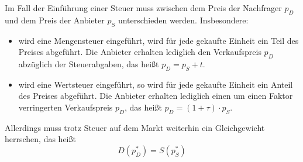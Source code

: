 Im Fall der Einführung einer Steuer muss zwischen dem Preis der Nachfrager $p_D$ und dem Preis der Anbieter $p_S$ unterschieden werden. Insbesondere:
\begin{itemize}
	\item wird eine Mengensteuer eingeführt, wird für jede gekaufte Einheit ein Teil des Preises abgeführt. Die Anbieter erhalten lediglich den Verkaufspreis $p_D$ abzüglich der Steuerabgaben, das heißt $p_D = p_S + t$.
	\item wird eine Wertsteuer eingeführt, so wird für jede gekaufte Einheit ein  Anteil des Preises abgeführt. Die Anbieter erhalten lediglich einen um einen Faktor verringerten Verkaufspreis $p_D$, das heißt $p_D = (1 + \tau) \cdot p_S$.
\end{itemize} 

Allerdings muss trotz Steuer auf dem Markt weiterhin ein Gleichgewicht herrschen, das heißt
\begin{equation*}
	D(p^*_D) = S(p^*_S) \tag*{$(*)$}
\end{equation*} 

